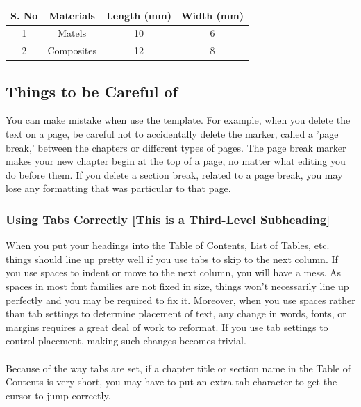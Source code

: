 \documentclass[a4paper,12pt,one side]{report}
\theoremstyle{definition}
\begin{document}
\begin{justify}
\begin{table}[H]
        \setlength\tabcolsep{27pt}
        \begin{tabular}{|c|c|c|c|}
        \hline S. No & Materials & Length (mm) & Width (mm) \\
					\hline
					 1 & Matels & 10 & 6 \\
					\hline
					 2 & Composites & 12 & 8 \\
					\hline
					
					\hline
				\end{tabular}
    
			\label{table1}
		\end{table}

\subsection{Things to be Careful of}
You can make mistake when use the template. For example, when you delete the text on a page, be careful not to accidentally delete the marker, called a 'page break,' between the chapters or different types of pages. The page break marker makes your new chapter begin at the top of a page, no matter what editing you do before them. If you delete a section break, related to a page break, you may lose any formatting that was particular to that page.
\subsubsection{Using Tabs Correctly [This is a Third-Level Subheading]}
When you put your headings into the Table of Contents, List of Tables, etc. things should line up pretty well if you use tabs to skip to the next column. If you use spaces to indent or move to the next column, you will have a mess. As spaces in most font families are not fixed in size, things won’t necessarily line up perfectly and you may be required to fix it.  Moreover, when you use spaces rather than tab settings to determine placement of text, any change in words, fonts, or margins requires a great deal of work to reformat.  If you use tab settings to control placement, making such changes becomes trivial. \\~\\
Because of the way tabs are set, if a chapter title or section name in the Table of Contents is very short, you may have to put an extra tab character to get the cursor to jump correctly. 

\end{justify}
\end{document}
